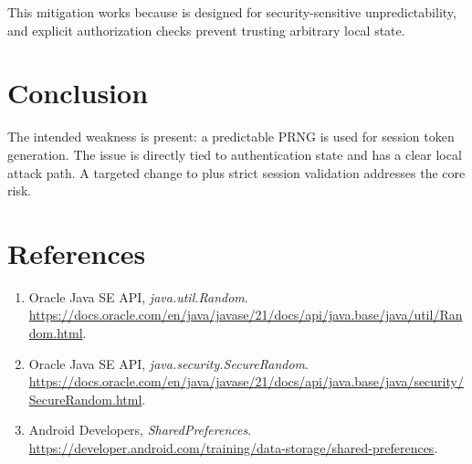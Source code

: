 \documentclass[letterpaper,twocolumn,10pt]{article}
\begin{document}
This mitigation works because  is designed for security-sensitive unpredictability, and explicit authorization checks prevent trusting arbitrary local state.

\section{Conclusion}
The intended weakness is present: a predictable PRNG is used for session token generation. The issue is directly tied to authentication state and has a clear local attack path. A targeted change to  plus strict session validation addresses the core risk.

\section{References}
\small
\begin{enumerate}
\item Oracle Java SE API, \textit{java.util.Random}.\\
\url{https://docs.oracle.com/en/java/javase/21/docs/api/java.base/java/util/Random.html}.
\item Oracle Java SE API, \textit{java.security.SecureRandom}.\\
\url{https://docs.oracle.com/en/java/javase/21/docs/api/java.base/java/security/SecureRandom.html}.
\item Android Developers, \textit{SharedPreferences}.\\
\url{https://developer.android.com/training/data-storage/shared-preferences}.
\end{enumerate}
\end{document}
